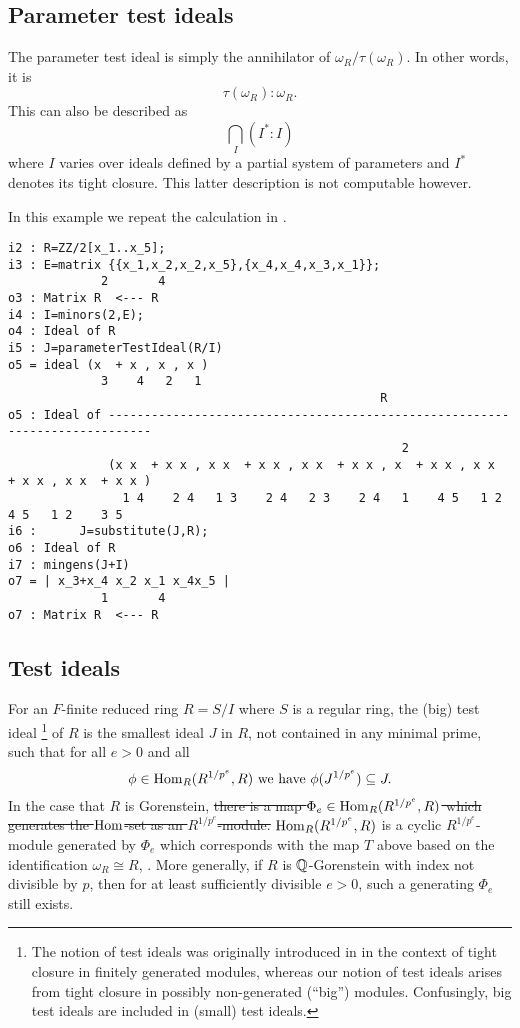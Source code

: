 \documentclass[11pt]{amsart}
\begin{document}
\subsection{Parameter test ideals}

The parameter test ideal is simply the annihilator of $\omega_R/\tau(\omega_R)$.  In other words, it is
\[
\tau(\omega_R) : \omega_R.
\]
This can also be described as
\[
\bigcap_{I} (I^* : I)
\]
where $I$ varies over ideals defined by a partial system of parameters and $I^*$ denotes its tight closure.  This latter description is not computable however.

\begin{example}\label{Example: parameter test ideal}
In this example we repeat the calculation in \cite[\S 9]{KatzmanParameterTestIdealOfCMRings}.

\begin{verbatim}
i2 : R=ZZ/2[x_1..x_5];
i3 : E=matrix {{x_1,x_2,x_2,x_5},{x_4,x_4,x_3,x_1}};
             2       4
o3 : Matrix R  <--- R
i4 : I=minors(2,E);
o4 : Ideal of R
i5 : J=parameterTestIdeal(R/I)
o5 = ideal (x  + x , x , x )
             3    4   2   1
                                                    R
o5 : Ideal of ----------------------------------------------------------------------------
                                                       2
              (x x  + x x , x x  + x x , x x  + x x , x  + x x , x x  + x x , x x  + x x )
                1 4    2 4   1 3    2 4   2 3    2 4   1    4 5   1 2    4 5   1 2    3 5
i6 :      J=substitute(J,R);
o6 : Ideal of R
i7 : mingens(J+I)
o7 = | x_3+x_4 x_2 x_1 x_4x_5 |
             1       4
o7 : Matrix R  <--- R
\end{verbatim}

\end{example}

\subsection{Test ideals}

For an $F$-finite reduced ring $R = S/I$ where $S$ is a regular ring, the (big) test ideal
\footnote{The notion of test ideals was originally introduced in \cite{HochsterHunekeTC1} in the context of tight closure in finitely generated modules, whereas our notion of test ideals arises from
tight closure in possibly non-generated (``big'') modules. Confusingly, big test ideals are included in (small) test ideals.}
of $R$ is the smallest ideal $J$ in $R$, not contained in any minimal prime, such that for all $e > 0$ and all
\[
\phi \in \operatorname{Hom}_R(R^{1/p^e}, R) \text{ we have } \phi(J^{1/p^e}) \subseteq J.
\]
In the case that $R$ is Gorenstein, 
\sout{there is a map $\Phi_e \in \operatorname{Hom}_R(R^{1/p^e}, R)$ which generates the $\operatorname{Hom}$-set as an $R^{1/p^e}$-module.  }
$\operatorname{Hom}_R(R^{1/p^e}, R)$ is a cyclic $R^{1/p^e}$-module generated by 
$\Phi_e$ which corresponds with the map $T$ above based on the identification 
$\omega_R \cong R$, \cite{BlickleSchwedeSurveyPMinusE}.  More generally, if $R$ is $\mathbb{Q}$-Gorenstein with index not divisible by $p$, then for at least sufficiently divisible $e > 0$, such a generating $\Phi_e$ still exists.
\end{document}
